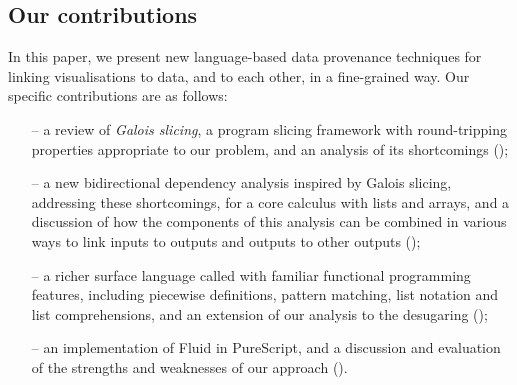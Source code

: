 \subsection{Our contributions}

In this paper, we present new language-based data provenance techniques for linking visualisations to data, and to each other, in a fine-grained way. Our specific contributions are as follows:

\begin{itemize}[leftmargin=*]
   \item[--] a review of \emph{Galois slicing}, a program slicing framework with round-tripping properties appropriate to our problem, and an analysis of its shortcomings ();
   \item[--] a new bidirectional dependency analysis inspired by Galois slicing, addressing these shortcomings, for a core calculus with lists and arrays, and a discussion of how the components of this analysis can be combined in various ways to link inputs to outputs and outputs to other outputs ();
   \item[--] a richer surface language called \OurLanguage with familiar functional programming features, including piecewise definitions, pattern matching, list notation and list comprehensions, and an extension of our analysis to the desugaring ();
   \item[--] an implementation of Fluid in PureScript, and a discussion and evaluation of the strengths and weaknesses of our approach ().
\end{itemize}
